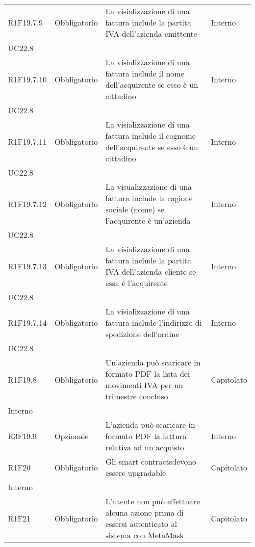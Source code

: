\begin{longtable}{ >{\centering}p{} >{\centering}p{}
		>{\raggedright}p{} >{\centering}p{}}
	R1F19.7.9	&	Obbligatorio	&	La visializzazione di una fattura include la partita IVA dell'azienda emittente	&	Interno\\ UC22.8	\tabularnewline
	R1F19.7.10	&	Obbligatorio	&	La visializzazione di una fattura include il nome dell'acquirente se esso è un cittadino	&	Interno\\ UC22.8	\tabularnewline
	R1F19.7.11	&	Obbligatorio	&	La visializzazione di una fattura include il cognome dell'acquirente se esso è un cittadino	&	Interno\\ UC22.8	\tabularnewline
	R1F19.7.12	&	Obbligatorio	&	La visualizzazione di una fattura include la ragione sociale (nome) se l'acquirente è un'azienda 	&	Interno\\ UC22.8	\tabularnewline
	R1F19.7.13	&	Obbligatorio	&	La visializzazione di una fattura include la partita IVA dell'azienda-cliente se essa è l'acquirente	&	Interno\\ UC22.8	\tabularnewline
	R1F19.7.14	&	Obbligatorio	&	La visializzazione di una fattura include l'indirizzo di spedizione dell'ordine	&	Interno\\ UC22.8	\tabularnewline
	R1F19.8	&	Obbligatorio	&	Un'azienda può scaricare in formato PDF la lista dei movimenti IVA per un trimestre concluso	&	Capitolato\\ Interno	\tabularnewline
	R3F19.9	&	Opzionale	&	L'azienda può scaricare in formato PDF la fattura relativa ad un acquisto	&	Interno	\tabularnewline
	R1F20	&	Obbligatorio	&	Gli smart contracts\glosp devono essere upgradable	&	Capitolato\\ Interno	\tabularnewline
	R1F21	&	Obbligatorio	&	L'utente non può effettuare alcuna azione prima di essersi autenticato al sistema con MetaMask\glo	&	Capitolato	\tabularnewline
	
	
	
\end{longtable}

